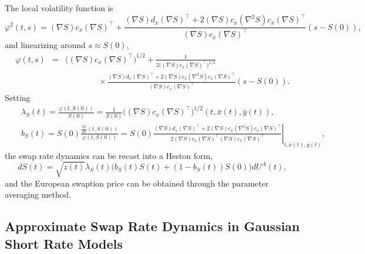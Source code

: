 \documentclass[12pt]{article}
\begin{document}
    The local volatility function is
    \begin{equation}
      \varphi^2(t,s)=(\nabla S) c_x (\nabla S)^{\top}
          + \frac{(\nabla S) d_x (\nabla S)^{\top} + 2(\nabla S) c_x (\nabla^2 S) c_x (\nabla S)^{\top}}
                 {(\nabla S) c_x (\nabla S)^{\top}}\left(s-S(0)\right),
    \end{equation}
    and linearizing around $s\approx S(0)$,
    \begin{eqnarray}
      \varphi(t,s)&=&\bigg((\nabla S) c_x (\nabla S)^{\top}\bigg)^{1/2}
                      + \frac{1}{2\bigg((\nabla S) c_x (\nabla S)^{\top}\bigg)^{1/2}}\nonumber\\
          &&\quad\quad\quad\quad \times\frac{(\nabla S) d_x (\nabla S)^{\top} + 2(\nabla S) c_x (\nabla^2 S) c_x (\nabla S)^{\top}}
                                            {(\nabla S) c_x (\nabla S)^{\top}}\left(s-S(0)\right).
      \label{expansion}
    \end{eqnarray}
    Setting
    \begin{eqnarray}
      &&\lambda_S(t)=\frac{\varphi(t,S(0))}{S(0)}=\frac{1}{S(0)}\bigg((\nabla S) c_x (\nabla S)^{\top}\bigg)^{1/2}\left(t,\bar{x}(t),\bar{y}(t)\right),\\
      &&b_S(t)=S(0)\frac{\frac{\partial\varphi}{\partial s}(t,S(0))}{\varphi(t,S(0))}
              =\left.S(0)\frac{(\nabla S) d_x (\nabla S)^{\top} + 2(\nabla S) c_x (\nabla^2 S) c_x (\nabla S)^{\top}}
                                            {2(\nabla S) c_x (\nabla S)^{\top}(\nabla S) c_x (\nabla S)^{\top}}\right|_{t,\bar{x}(t),\bar{y}(t)},
    \end{eqnarray}
    the swap rate dynamics can be recast into a Heston form,
    \begin{equation}
      dS(t)=\sqrt{z(t)}\lambda_S(t)\Big(b_S(t)S(t)+\left(1-b_S(t)\right)S(0)\Big)dU^A(t),
    \end{equation}
    and the European swaption price can be obtained through the parameter averaging method.

  \subsection{Approximate Swap Rate Dynamics in Gaussian Short Rate Models}
\end{document}
